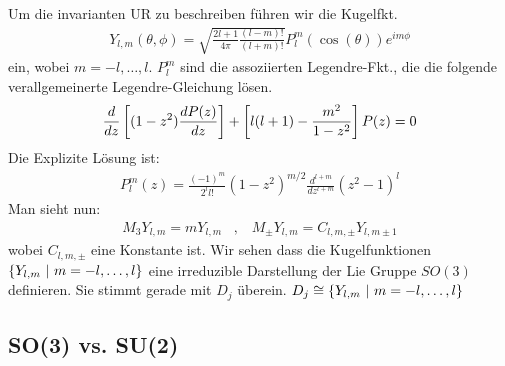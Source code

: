 Um die invarianten UR zu beschreiben führen wir die Kugelfkt.
\begin{align*}
    Y_{l,m} (\theta,\phi) = \sqrt{\frac{2l+1}{4 \pi} \frac{(l-m)!}{(l+m)!}} P_l^m (\cos(\theta)) e^{i m \phi}
\end{align*}
ein, wobei $m=-l,\dots,l$. $P_l^m$ sind die assoziierten Legendre-Fkt., die die
folgende verallgemeinerte Legendre-Gleichung lösen.
\begin{align*}
    \frac{d}{dz} \left[ (1-z^2) \frac{d P(z)}{dz} \right] +
    \left[ l(l+1) - \frac{m^2}{1-z^2} \right] P(z) = 0
\end{align*}
Die Explizite Lösung ist:
\begin{align*}
    P_l^m (z) = \frac{(-1)^m}{2^l l!} (1-z^2)^{m/2} \frac{d^{l+m}}{dz^{l+m}} (z^2 -1)^l
\end{align*}
Man sieht nun:
\begin{align*}
    M_3 Y_{l,m} = m Y_{l,m}
    \hspace{10pt} , \hspace{10pt}
    M_\pm Y_{l,m} = C_{l,m,\pm} Y_{l,m \pm 1}
\end{align*}
wobei $C_{l,m,\pm}$ eine Konstante ist. Wir sehen dass die Kugelfunktionen
$\left\{ Y_{l,m} \ | \ m = -l,\dots,l \right\}$
eine irreduzible Darstellung der Lie Gruppe $SO(3)$ definieren.
Sie stimmt gerade mit $D_j$ überein.
$D_j \cong \left\{ Y_{l,m} \ | \ m = -l,\dots,l \right\}$


\subsection{SO(3) vs. SU(2)}

